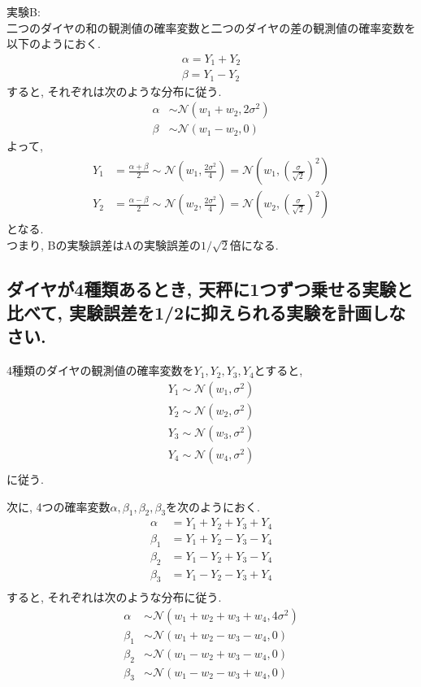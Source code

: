 \documentclass[uplatex]{jsarticle}
\begin{document}
    \noindent
    実験B: \\
    二つのダイヤの和の観測値の確率変数と二つのダイヤの差の観測値の確率変数を以下のようにおく.
    \begin{align*}
        \alpha = Y_1 + Y_2 \\
        \beta = Y_1 - Y_2
    \end{align*}
    すると, それぞれは次のような分布に従う.
    \begin{align*}
        \alpha &\sim \mathcal{N}(w_1 + w_2, 2\sigma^2) \\
        \beta &\sim \mathcal{N}(w_1 - w_2, 0)
    \end{align*}
    よって,
    \begin{align*}
        Y_1 &= \frac{\alpha + \beta}{2} \sim \mathcal{N}(w_1, \frac{2\sigma^2}{4}) = \mathcal{N}(w_1, (\frac{\sigma}{\sqrt{2}})^2) \\
        Y_2 &= \frac{\alpha - \beta}{2} \sim \mathcal{N}(w_2, \frac{2\sigma^2}{4}) = \mathcal{N}(w_2, (\frac{\sigma}{\sqrt{2}})^2)
    \end{align*}
    となる. \\
    つまり, Bの実験誤差はAの実験誤差の$1/\sqrt{2}$倍になる.
    \newpage

    \subsection{ダイヤが4種類あるとき, 天秤に1つずつ乗せる実験と比べて, 実験誤差を1/2に抑えられる実験を計画しなさい.}
    4種類のダイヤの観測値の確率変数を$Y_1, Y_2, Y_3, Y_4$とすると, 
    \begin{align*}
        Y_1 \sim \mathcal{N}(w_1, \sigma^2) \\
        Y_2 \sim \mathcal{N}(w_2, \sigma^2) \\
        Y_3 \sim \mathcal{N}(w_3, \sigma^2) \\
        Y_4 \sim \mathcal{N}(w_4, \sigma^2) \\
    \end{align*}
    に従う.

    次に, 4つの確率変数$\alpha, \beta_1, \beta_2, \beta_3$を次のようにおく.
    \begin{align*}
        \alpha  &= Y_1 + Y_2 + Y_3 + Y_4 \\
        \beta_1 &= Y_1 + Y_2 - Y_3 - Y_4 \\
        \beta_2 &= Y_1 - Y_2 + Y_3 - Y_4 \\
        \beta_3 &= Y_1 - Y_2 - Y_3 + Y_4 \\
    \end{align*}
    すると, それぞれは次のような分布に従う.
    \begin{align*}
        \alpha  &\sim \mathcal{N}(w_1+w_2+w_3+w_4, 4\sigma^2) \\
        \beta_1 &\sim \mathcal{N}(w_1+w_2-w_3-w_4, 0) \\
        \beta_2 &\sim \mathcal{N}(w_1-w_2+w_3-w_4, 0) \\
        \beta_3 &\sim \mathcal{N}(w_1-w_2-w_3+w_4, 0) \\
    \end{align*}
    
\end{document}
